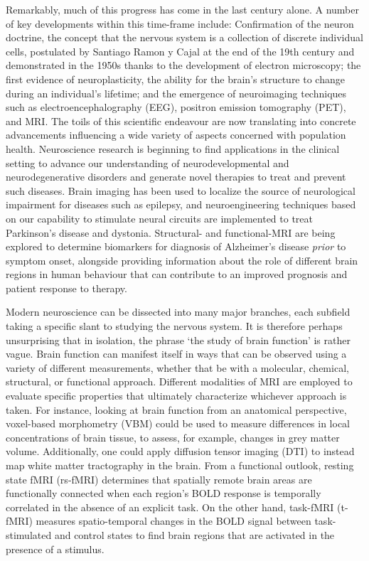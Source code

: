 Remarkably, much of this progress has come in the last century alone. A number of key developments within this time-frame include: Confirmation of the neuron doctrine, the concept that the nervous system is a collection of discrete individual cells, postulated by Santiago Ramon y Cajal at the end of the 19th century and demonstrated in the 1950s thanks to the development of electron microscopy; the first evidence of neuroplasticity, the ability for the brain's structure to change during an individual's lifetime; and the emergence of neuroimaging techniques such as electroencephalography (EEG), positron emission tomography (PET), and MRI. The toils of this scientific endeavour are now translating into concrete advancements influencing a wide variety of aspects concerned with population health. Neuroscience research is beginning to find applications in the clinical setting to advance our understanding of neurodevelopmental and neurodegenerative disorders and generate novel therapies to treat and prevent such diseases. Brain imaging has been used to localize the source of neurological impairment for diseases such as epilepsy, and neuroengineering techniques based on our capability to stimulate neural circuits are implemented to treat Parkinson's disease and dystonia. Structural- and functional-MRI are being explored to determine biomarkers for diagnosis of Alzheimer's disease \textit{prior} to symptom onset, alongside providing information about the role of different brain regions in human behaviour that can contribute to an improved prognosis and patient response to therapy.  

Modern neuroscience can be dissected into many major branches, each subfield taking a specific slant to studying the nervous system. It is therefore perhaps unsurprising that in isolation, the phrase `the study of brain function' is rather vague. Brain function can manifest itself in ways that can be observed using a variety of different measurements, whether that be with a molecular, chemical, structural, or functional approach. Different modalities of MRI are employed to evaluate specific properties that ultimately characterize whichever approach is taken. For instance, looking at brain function from an anatomical perspective, voxel-based morphometry (VBM) could be used to measure differences in local concentrations of brain tissue, to assess, for example, changes in grey matter volume. Additionally, one could apply diffusion tensor imaging (DTI) to instead map white matter tractography in the brain. From a functional outlook, resting state fMRI (rs-fMRI) determines that spatially remote brain areas are functionally connected when each region's BOLD response is temporally correlated in the absence of an explicit task. On the other hand, task-fMRI (t-fMRI) measures spatio-temporal changes in the BOLD signal between task-stimulated and control states to find brain regions that are activated in the presence of a stimulus. 

